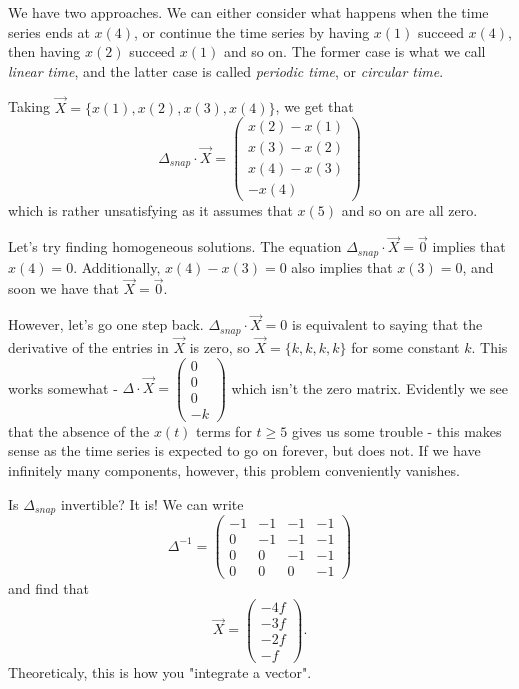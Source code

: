 \documentclass[a4paper, 12pt,oneside,openany]{book}
\begin{document}
We have two approaches. We can either consider what happens when the time series ends at $x(4)$, or continue the time series by having $x(1)$ succeed $x(4)$, then having $x(2)$ succeed $x(1)$ and so on. The former case is what we call \emph{linear time}, and the latter case is called \emph{periodic time}, or \emph{circular time}.

 Taking $\vec{X} = \{x(1), x(2), x(3), x(4)\}$, we get that $$\Delta_{snap} \cdot \vec{X} = \begin{pmatrix} x(2)-x(1) \\ x(3)-x(2) \\ x(4)-x(3) \\ -x(4) \end{pmatrix}$$ which is rather unsatisfying as it assumes that $x(5)$ and so on are all zero. 

Let's try finding homogeneous solutions. The equation $\Delta_{snap} \cdot \vec{X} =\vec{0}$ implies that $x(4)=0$. Additionally, $x(4)-x(3)=0$ also implies that $x(3)=0$, and soon we have that $\vec{X}=\vec{0}$. 

However, let's go one step back. $\Delta_{snap} \cdot \vec{X} =0$ is equivalent to saying that the derivative of the entries in $\vec{X}$ is zero, so $\vec{X}=\{k, k, k, k\}$ for some constant $k$. This works somewhat - $\Delta \cdot \vec{X} = \begin{pmatrix} 0\\0\\0\\-k \end{pmatrix}$ which isn't the zero matrix. Evidently we see that the absence of the $x(t)$ terms for $t\geq 5$ gives us some trouble - this makes sense as the time series is expected to go on forever, but does not. If we have infinitely many components, however, this problem conveniently vanishes. 

Is $\Delta_{snap}$ invertible? It is! We can write $$\Delta^{-1} = \begin{pmatrix} -1&-1&-1&-1\\0&-1&-1&-1\\0&0&-1&-1\\0&0&0&-1 \end{pmatrix}$$ and find that $$\vec{X} = \begin{pmatrix} -4f\\-3f\\-2f\\-f \end{pmatrix}.$$ Theoreticaly, this is how you "integrate a vector".
\end{document}
